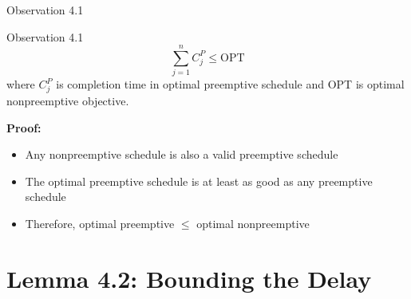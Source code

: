 \documentclass[aspectratio=169, 12pt]{beamer}
\begin{document}
\begin{frame}{Observation 4.1}
    \begin{block}{Observation 4.1}
    $$\sum_{j=1}^{n} C_j^P \leq \text{OPT}$$
        where $C_j^P$ is completion time in optimal preemptive schedule and OPT is optimal nonpreemptive objective.
    \end{block}

    \vspace{0.5cm}
    \textbf{Proof:}
    \begin{itemize}
        \item<2-> Any nonpreemptive schedule is also a valid preemptive schedule
        \item<3-> The optimal preemptive schedule is at least as good as any preemptive schedule
        \item<4-> Therefore, optimal preemptive $\leq$ optimal nonpreemptive
    \end{itemize}
\end{frame}

\section{Lemma 4.2: Bounding the Delay}

    
    
        

            
\end{document}
